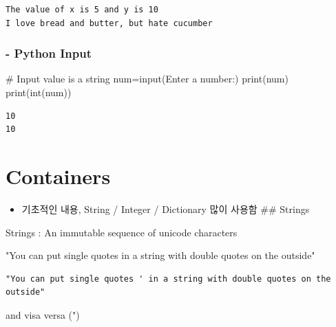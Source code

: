 \documentclass[
  a4paper,
  DIV=11,
  numbers=noendperiod]{scrreprt}
\newenvironment{Shaded}{\begin{snugshade}}{\end{snugshade}}
\newcommand{\BuiltInTok}[1]{\textcolor[rgb]{0.00,0.23,0.31}{#1}}
\newcommand{\CommentTok}[1]{\textcolor[rgb]{0.37,0.37,0.37}{#1}}
\newcommand{\NormalTok}[1]{\textcolor[rgb]{0.00,0.23,0.31}{#1}}
\newcommand{\OperatorTok}[1]{\textcolor[rgb]{0.37,0.37,0.37}{#1}}
\newcommand{\StringTok}[1]{\textcolor[rgb]{0.13,0.47,0.30}{#1}}
\providecommand{\tightlist}{%
  \setlength{\itemsep}{0pt}\setlength{\parskip}{0pt}}\usepackage{longtable,booktabs,array}
\begin{document}
\begin{verbatim}
The value of x is 5 and y is 10
I love bread and butter, but hate cucumber
\end{verbatim}

\subsection{- Python Input}\label{python-input}

\begin{Shaded}
\begin{Highlighting}[]
\CommentTok{\# Input value is a string}
\NormalTok{num}\OperatorTok{=}\BuiltInTok{input}\NormalTok{(}\StringTok{\textquotesingle{}Enter a number:\textquotesingle{}}\NormalTok{)}
\BuiltInTok{print}\NormalTok{(num)}
\BuiltInTok{print}\NormalTok{(}\BuiltInTok{int}\NormalTok{(num))}
\end{Highlighting}
\end{Shaded}

\begin{verbatim}
10
10
\end{verbatim}

\chapter{Containers}\label{containers}

\begin{itemize}
\tightlist
\item
  기초적인 내용, String / Integer / Dictionary 많이 사용함 \#\# Strings
\end{itemize}

Strings : An immutable sequence of unicode characters

\begin{Shaded}
\begin{Highlighting}[]
\CommentTok{"You can put single quotes \textquotesingle{} in a string with double quotes on the outside"}
\end{Highlighting}
\end{Shaded}

\begin{verbatim}
"You can put single quotes ' in a string with double quotes on the outside"
\end{verbatim}

\begin{Shaded}
\begin{Highlighting}[]
\CommentTok{\textquotesingle{}and visa versa (")\textquotesingle{}}
\end{Highlighting}
\end{Shaded}
\end{document}
